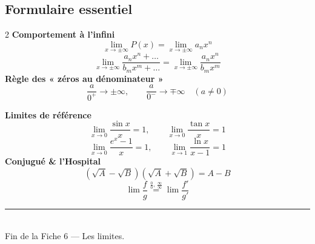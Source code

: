 \documentclass[11pt,a4paper]{article}
\begin{document}
\subsection{Formulaire essentiel}

\begin{multicols}{2}
\noindent\textbf{Comportement à l'infini}
\[ \lim_{x\to\pm\infty} P(x)=\lim_{x\to\pm\infty} a_n x^n \]
\[ \lim_{x\to\pm\infty}\frac{a_n x^n+\dots}{b_m x^m+\dots}=\lim_{x\to\pm\infty}\frac{a_n x^n}{b_m x^m} \]
\textbf{Règle des « zéros au dénominateur »}
\[ \frac{a}{0^{+}}\to\pm\infty,\qquad \frac{a}{0^{-}}\to\mp\infty\quad(a\neq0) \]

\columnbreak
\noindent\textbf{Limites de référence}
\[ \lim_{x\to 0}\frac{\sin x}{x}=1,\qquad \lim_{x\to 0}\frac{\tan x}{x}=1 \]
\[ \lim_{x\to 0}\frac{e^{x}-1}{x}=1,\qquad \lim_{x\to 1}\frac{\ln x}{x-1}=1 \]
\textbf{Conjugué \& l'Hospital}
\[ (\sqrt A-\sqrt B)(\sqrt A+\sqrt B)=A-B \]
\[ \lim\frac fg \overset{\tfrac00,\,\tfrac{\infty}{\infty}}{=}\lim\frac{f'}{g'} \]
\end{multicols}

\vfill
\begin{center}
\textcolor{primary}{\rule{0.5\textwidth}{1pt}}\\[4pt]
{\small\color{black!60}Fin de la Fiche 6 — Les limites.}
\end{center}
\end{document}
